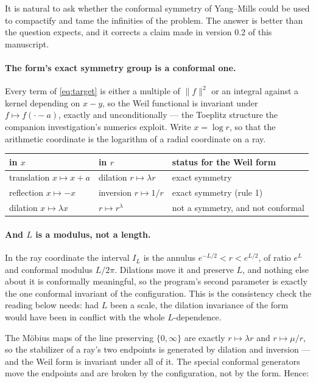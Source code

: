 It is natural to ask whether the conformal symmetry of Yang--Mills could be used
to compactify and tame the infinities of the problem. The answer is better than
the question expects, and it corrects a claim made in version 0.2 of this
manuscript.

\paragraph{The form's exact symmetry group is a conformal one.}
Every term of \eqref{eq:target} is either a multiple of $\lVert f\rVert^2$ or an
integral against a kernel depending on $x-y$, so the Weil functional is invariant
under $f\mapsto f(\cdot-a)$, exactly and unconditionally --- the Toeplitz
structure the companion investigation's numerics exploit. Write $x=\log r$, so
that the arithmetic coordinate is the logarithm of a radial coordinate on a ray.

\begin{center}
\begin{tabular}{@{}lll@{}}
\toprule
in $x$ & in $r$ & status for the Weil form\\
\midrule
translation $x\mapsto x+a$ & dilation $r\mapsto\lambda r$ & exact symmetry\\
reflection $x\mapsto-x$ & inversion $r\mapsto1/r$ & exact symmetry (rule 1)\\
dilation $x\mapsto\lambda x$ & $r\mapsto r^\lambda$ & not a symmetry, and not conformal\\
\bottomrule
\end{tabular}
\end{center}

\paragraph{And $L$ is a modulus, not a length.} In the ray coordinate the
interval $I_L$ is the annulus $e^{-L/2}<r<e^{L/2}$, of ratio $e^L$ and conformal
modulus $L/2\pi$. Dilations move it and preserve $L$, and nothing else about it is
conformally meaningful, so the program's second parameter is exactly the one
conformal invariant of the configuration. This is the consistency check the
reading below needs: had $L$ been a scale, the dilation invariance of the form
would have been in conflict with the whole $L$-dependence.

The Möbius maps of the line preserving $\{0,\infty\}$ are exactly
$r\mapsto\lambda r$ and $r\mapsto\mu/r$, so the stabilizer of a ray's two
endpoints is generated by dilation and inversion --- and the Weil form is
invariant under all of it. The special conformal generators move the endpoints
and are broken by the configuration, not by the form. Hence:

